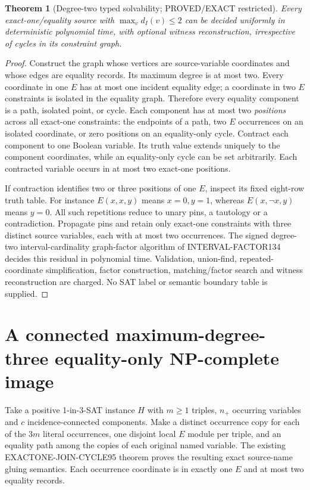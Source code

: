 \documentclass[11pt]{article}
\newtheorem{theorem}{Theorem}
\begin{document}
\begin{theorem}[Degree-two typed solvability; PROVED/EXACT restricted]
Every exact-one/equality source with $\max_v d_I(v)\le2$ can be decided
uniformly in deterministic polynomial time, with optional witness
reconstruction, irrespective of cycles in its constraint graph.
\end{theorem}
\begin{proof}
Construct the graph whose vertices are source-variable coordinates and whose
edges are equality records. Its maximum degree is at most two.
Every coordinate in one $E$ has at most one incident equality edge;
a coordinate in two $E$ constraints is isolated in the equality graph.
Therefore every equality component is a path, isolated point, or cycle.
Each component has at most two \emph{positions} across all exact-one
constraints: the endpoints of a path, two $E$ occurrences on an isolated
coordinate, or zero positions on an equality-only cycle.
Contract each component to one Boolean variable. Its truth value extends
uniquely to the component coordinates, while an equality-only cycle can
be set arbitrarily. Each contracted variable occurs in at most two
exact-one positions.

If contraction identifies two or three positions of one $E$, inspect
its fixed eight-row truth table. For instance $E(x,x,y)$ means
$x=0,y=1$, whereas $E(x,\neg x,y)$ means $y=0$.
All such repetitions reduce to unary pins, a tautology or a contradiction.
Propagate pins and retain only exact-one constraints with three distinct
source variables, each with at most two occurrences. The signed
degree-two interval-cardinality graph-factor algorithm of
INTERVAL-FACTOR134 decides this residual in polynomial time. Validation,
union-find, repeated-coordinate simplification, factor construction,
matching/factor search and witness reconstruction are charged. No SAT
label or semantic boundary table is supplied.
\end{proof}

\section{A connected maximum-degree-three equality-only NP-complete image}
Take a positive 1-in-3-SAT instance $H$ with $m\ge1$ triples,
$n_+$ occurring variables and $c$ incidence-connected components.
Make a distinct occurrence copy for each of the $3m$ literal
occurrences, one disjoint local $E$ module per triple, and an equality
path among the copies of each original named variable.
The existing EXACTONE-JOIN-CYCLE95 theorem proves the resulting exact
source-name gluing semantics. Each occurrence coordinate is in exactly
one $E$ and at most two equality records.
\end{document}
